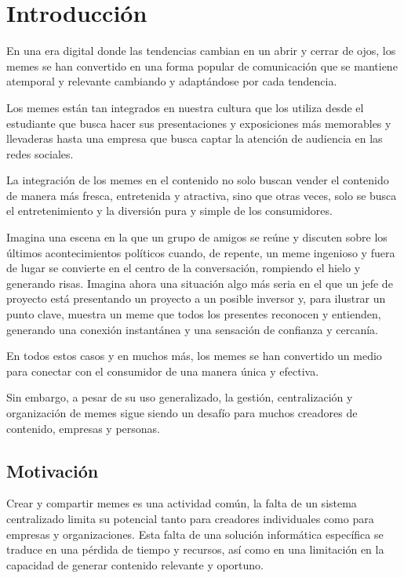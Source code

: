 \chapter{Introducción}

En una era digital donde las tendencias cambian en un abrir y cerrar de ojos, los memes se han convertido en una forma popular de comunicación que se mantiene atemporal y relevante cambiando y adaptándose por cada tendencia.

Los memes están tan integrados en nuestra cultura que los utiliza desde el estudiante que busca hacer sus presentaciones y exposiciones más memorables y llevaderas hasta una empresa que busca captar la atención de audiencia en las redes sociales.

La integración de los memes en el contenido no solo buscan vender el contenido de manera más fresca, entretenida y atractiva, sino que otras veces, solo se busca el entretenimiento y la diversión pura y simple de los consumidores.

Imagina una escena en la que un grupo de amigos se reúne y discuten sobre los últimos acontecimientos políticos cuando, de repente, un meme ingenioso y fuera de lugar se convierte en el centro de la conversación, rompiendo el hielo y generando risas. Imagina ahora una situación algo más seria en el que un jefe de proyecto está presentando un proyecto a un posible inversor y, para ilustrar un punto clave, muestra un meme que todos los presentes reconocen y entienden, generando una conexión instantánea y una sensación de confianza y cercanía.


En todos estos casos y en muchos más, los memes se han convertido un medio para conectar con el consumidor de una manera única y efectiva.

Sin embargo, a pesar de su uso generalizado, la gestión, centralización y organización de memes sigue siendo un desafío para muchos creadores de contenido, empresas y personas.

\section{Motivación}

Crear y compartir memes es una actividad común, la falta de un sistema centralizado limita su potencial tanto para creadores individuales como para empresas y organizaciones. Esta falta de una solución informática específica se traduce en una pérdida de tiempo y recursos, así como en una limitación en la capacidad de generar contenido relevante y oportuno.

